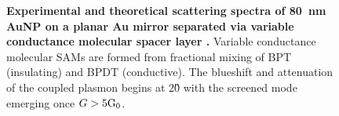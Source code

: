 \documentclass{article}
\begin{document}
\begin{figure}[bt]
\centering
\vspace{-10pt}
\caption[Experimental and theoretical scattering spectra of \SI{80}{nm} AuNP dimers connected via variable conductance molecular linkers \cite{benz2014}]{\textbf{Experimental and theoretical scattering spectra of \SI{80}{nm} AuNP on a planar Au mirror separated via variable conductance molecular spacer layer \cite{benz2014}.} Variable conductance molecular SAMs are formed from fractional mixing of BPT (insulating) and BPDT (conductive). The blueshift and attenuation of the coupled plasmon begins at 2\G0 with the screened mode emerging once $G>5\mathrm{G_{0}}$.}
\label{fig:benz_molecular_npom}
\vspace{-5pt}
\end{figure}
\end{document}
